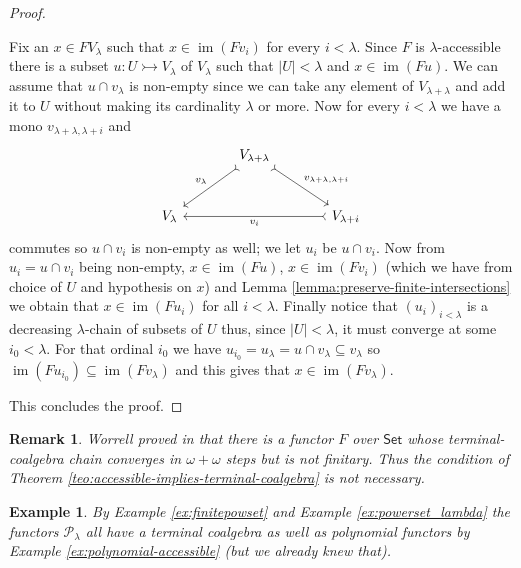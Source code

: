 \documentclass[letterpaper, 11pt, oneside]{memoir}
\theoremstyle{myteo}
\newtheorem{example}[theorem]{Example}
\newtheorem{remark}[theorem]{Remark}
\numberwithin{equation}{section}
\newcommand{\Set}{\textsf{Set}}
\DeclareMathOperator{\im}{im}
\begin{document}
\begin{proof}
\begin{itemize}
    Fix an \(x \in FV_\lambda\) such that \(x \in \im(Fv_i)\) for every \(i < \lambda\).
    Since \(F\) is \(\lambda\)-accessible there is a subset \(u : U \rightarrowtail V_\lambda\) of \(V_\lambda\) such that \(|U| < \lambda\) and \(x \in \im(Fu)\).
    We can assume that \(u \cap v_\lambda\) is non-empty since we can take any element of \(V_{\lambda + \lambda}\) and add it to \(U\) without making its cardinality \(\lambda\) or more.
    Now for every \(i < \lambda\) we have a mono \(v_{\lambda + \lambda, \lambda + i}\) and
    \begin{equation*}
      \begin{tikzcd}[sep=large]
        & V_{\lambda + \lambda} \ar[dl, tail, "v_\lambda"'] \ar[dr, tail, "v_{\lambda + \lambda, \lambda + i}"]&\\
        V_\lambda & & V_{\lambda + i} \ar[ll, tail, "v_i"]
      \end{tikzcd}
    \end{equation*}
    commutes so \(u \cap v_i\) is non-empty as well; we let \(u_i\) be \(u \cap v_i\).
    Now from \(u_i = u \cap v_i\) being non-empty, \(x \in \im(Fu)\), \(x \in \im(Fv_i)\) (which we have from choice of \(U\) and hypothesis on \(x\)) and Lemma \ref{lemma:preserve-finite-intersections} we obtain that \(x\in\im(Fu_i)\) for all \(i < \lambda\).
    Finally notice that \((u_i)_{i < \lambda}\) is a decreasing \(\lambda\)-chain of subsets of \(U\) thus, since \(|U| < \lambda\), it must converge at some \(i_0 < \lambda\).
    For that ordinal \(i_0\) we have \(u_{i_0} = u_\lambda = u \cap v_\lambda \subseteq v_{\lambda}\) so \(\im(Fu_{i_0}) \subseteq \im(Fv_{\lambda})\) and this gives that \(x \in \im(Fv_{\lambda})\).
  \end{itemize}
  This concludes the proof.
\end{proof}

\begin{remark}
  Worrell proved in \cite{Worrell2005OnTF} that there is a functor \(F\) over \(\Set\) whose terminal-coalgebra chain converges in \(\omega + \omega\) steps but is not finitary.
  Thus the condition of Theorem \ref{teo:accessible-implies-terminal-coalgebra} is not necessary.
\end{remark}

\begin{example}
  \label{ex:limitedpowset-have-tcoalgebra}
  By Example \ref{ex:finitepowset} and Example \ref{ex:powerset_lambda} the functors \(\mathcal{P}_\lambda\) all have a terminal coalgebra as well as polynomial functors by Example \ref{ex:polynomial-accessible} (but we already knew that).
\end{example}
\end{document}
